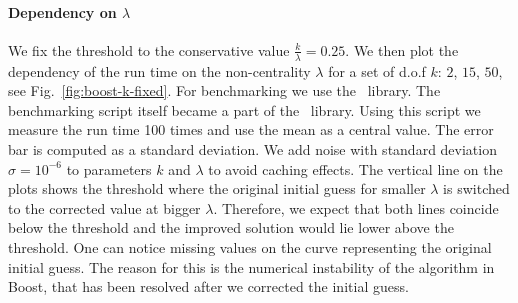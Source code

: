 \documentclass[final,5p,twocolumn,times,authoryear]{elsarticle}
\begin{document}
\paragraph{Dependency on $\lambda$} We fix the threshold to the conservative value  $\frac{k}{\lambda} = 0.25$. We then plot the dependency of the run time on the non-centrality $\lambda$ for a set of d.o.f $k$: $2$, $15$, $50$, see Fig.~\ref{fig:boost-k-fixed}. For benchmarking we use the~\cite{gbenchmark} library. The benchmarking script itself became a part of the~\cite{gbench-script} library. Using this script we measure the run time 100 times and use the mean as a central value. The error bar is computed as a standard deviation. We add noise with standard deviation $\sigma = 10^{-6}$ to parameters $k$ and $\lambda$ to avoid caching effects. The vertical line on the plots shows the threshold where the original initial guess for smaller $\lambda$ is switched to the corrected value at bigger $\lambda$. Therefore, we expect that both lines coincide below the threshold and the improved solution would lie lower above the threshold. One can notice missing values on the curve representing the original initial guess. The reason for this is the numerical instability of the algorithm in Boost, that has been resolved after we corrected the initial guess.
%
\end{document}
